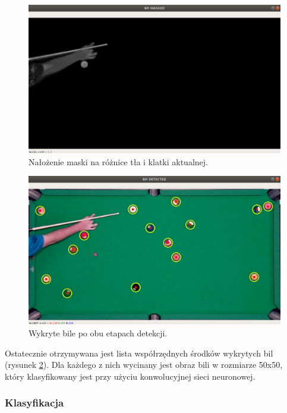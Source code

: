 \documentclass[12pt]{article}
\begin{document}
    \begin{figure}[!htb]
        \centering
        \includegraphics[width=15cm]{./images/obrazki/bp/masked_hc.png}
        \caption{Nałożenie maski na różnice tła i klatki aktualnej.}
        \label{masked_hc}
    \end{figure}

    \begin{figure}[!htb]
        \centering
        \includegraphics[width=15cm]{./images/obrazki/bp/bp_detected_2.png}
        \caption{Wykryte bile po obu etapach detekcji.}
        \label{bp_detected2}
    \end{figure}

    Ostatecznie otrzymywana jest lista współrzędnych środków wykrytych bil (rysunek \ref{bp_detected2}). Dla każdego z nich wycinany jest obraz bili w rozmiarze 50x50, który klasyfikowany jest przy użyciu konwolucyjnej sieci neuronowej.
 
    \subsubsection{Klasyfikacja}
\end{document}
